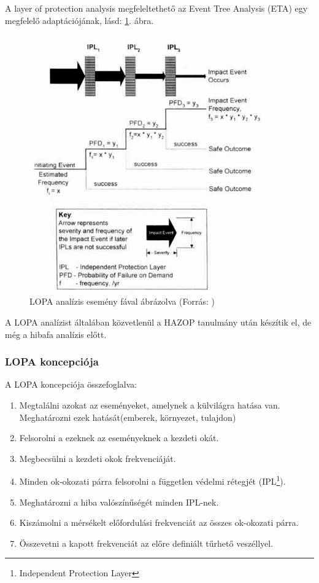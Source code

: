 A layer of protection analysis megfeleltethető az Event Tree Analysis (ETA) egy megfelelő adaptációjának\cite{HRRS}, lásd: \ref{fig:lop_eta}. ábra.

\begin{figure}
    \footnotesize
    \centering
    \includegraphics[width=100mm, keepaspectratio]{figures/lopa.jpg}
    \caption{LOPA analízis esemény fával ábrázolva (Forrás: \cite{LOPA1})}
    \label{fig:lop_eta}
\end{figure}

A LOPA analízist általában közvetlenül a HAZOP tanulmány után készítik el, de még a hibafa analízis előtt.

\subsubsection{LOPA koncepciója}
A LOPA koncepciója összefoglalva:
\begin{enumerate}
    \item Megtalálni azokat az eseményeket, amelynek a külvilágra hatása van. Meghatározni ezek hatását(emberek, környezet, tulajdon)
    \item Felsorolni a ezeknek az eseményeknek a kezdeti okát.
    \item Megbecsülni a kezdeti okok frekvenciáját.
    \item Minden ok-okozati párra felsorolni a független védelmi rétegjét (IPL\footnote{Independent Protection Layer}).
    \item Meghatározni a hiba valószínűségét minden IPL-nek.
    \item Kiszámolni a mérsékelt előfordulási frekvenciát az összes ok-okozati párra.
    \item Összevetni a kapott frekvenciát az előre definiált tűrhető veszéllyel.
\end{enumerate}

